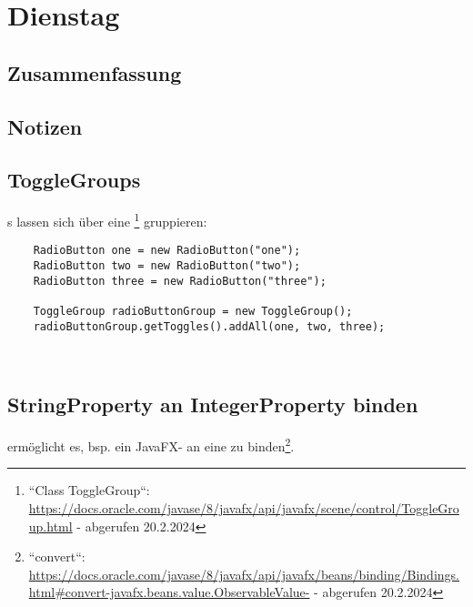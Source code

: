 \section{Dienstag}

\subsection{Zusammenfassung}



\subsection{Notizen}

\subsection*{ToggleGroups}
s lassen sich über eine \footnote{
``Class ToggleGroup``: \url{https://docs.oracle.com/javase/8/javafx/api/javafx/scene/control/ToggleGroup.html} - abgerufen 20.2.2024
} gruppieren:

\begin{verbatim}
    RadioButton one = new RadioButton("one");
    RadioButton two = new RadioButton("two");
    RadioButton three = new RadioButton("three");

    ToggleGroup radioButtonGroup = new ToggleGroup();
    radioButtonGroup.getToggles().addAll(one, two, three);
\end{verbatim}\\

\subsection*{StringProperty an IntegerProperty binden}

\begin{center}\end{center}
ermöglicht es, bsp. ein JavaFX- an eine  zu binden\footnote{
``convert``: \url{https://docs.oracle.com/javase/8/javafx/api/javafx/beans/binding/Bindings.html#convert-javafx.beans.value.ObservableValue-} - abgerufen 20.2.2024
}.\\

